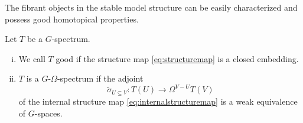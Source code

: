 The fibrant objects in the stable model structure can be easily
characterized and possess good homotopical properties.
\begin{mydef}
Let $T$ be a $G$-spectrum.
\begin{enumerate}[(i)]
\item We call $T$ good if the structure map \eqref{eq:structuremap}
is a closed embedding.
\item $T$ is a $G$-$\Omega$-spectrum if the adjoint
\begin{equation}
\tilde \sigma_{U\subseteq V}: T(U)\to \Omega^{V-U}T(V)\label{eq:adjointinternalstructuremap}
\end{equation}
of the internal structure map \eqref{eq:internalstructuremap} is
a weak equivalence of $G$-spaces.
\end{enumerate}
\end{mydef}

